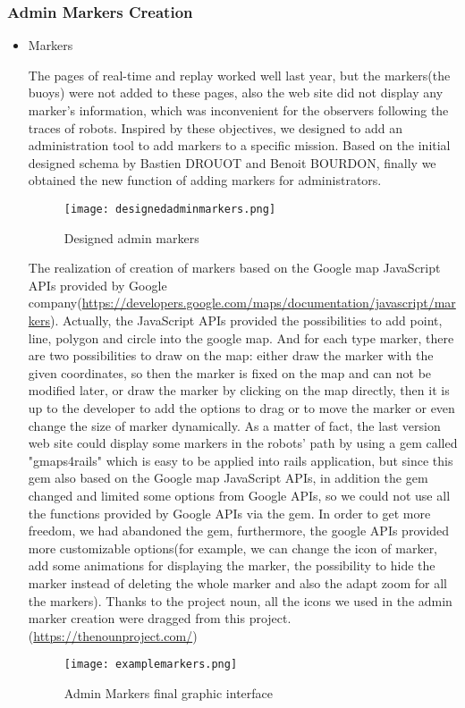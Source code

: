 \subsubsection{Admin Markers Creation}
\begin{itemize}
\item{Markers}


The pages of real-time and replay worked well last year, but the markers(the buoys) were not added to these pages, also the web site did not display any marker's information, which was inconvenient for the observers following the traces of robots. Inspired by these objectives, we designed to add an administration tool to add markers to a specific mission. Based on the initial designed schema by Bastien DROUOT and Benoit BOURDON, finally we obtained the new function of adding markers for administrators.
\begin{figure}[h!]
\centering
\texttt{[image: designedadminmarkers.png]}
\caption{Designed admin markers }
\label{fig-sample}
\end{figure}

The realization of creation of markers based on the Google map JavaScript APIs provided by Google company(\url{https://developers.google.com/maps/documentation/javascript/markers}). Actually, the JavaScript APIs provided the possibilities to add point, line, polygon and circle into the google map. And for each type marker, there are two possibilities to draw on the map: either draw the marker with the given coordinates, so then the marker is fixed on the map and can not be modified later, or draw the marker by clicking on the map directly, then it is up to the developer to add the options to drag or to move the marker or even change the size of marker dynamically. 
As a matter of fact, the last version web site could display some markers in the robots' path by using a gem called "gmaps4rails" which is easy to be applied into rails application, but since this gem also based on the Google map JavaScript APIs, in addition the gem changed and limited some options from Google APIs, so we could not use all the functions provided by Google APIs via the gem. In order to get more freedom, we had abandoned the gem, furthermore, the google APIs provided more customizable options(for example, we can change the icon of marker, add some animations for displaying the marker, the possibility to hide the marker instead of deleting the whole marker and also the adapt zoom for all the markers). Thanks to the project noun, all the icons we used in the admin marker creation were dragged from this project.(\url{https://thenounproject.com/}) 
\begin{figure}[h!]
\centering
\texttt{[image: examplemarkers.png]}
\caption{Admin Markers final graphic interface }
\label{fig-sample}
\end{figure}


\end{itemize}
